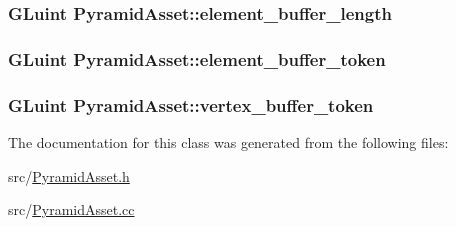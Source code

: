 \subsubsection[{element\+\_\+buffer\+\_\+length}]{\setlength{\rightskip}{0pt plus 5cm}G\+Luint Pyramid\+Asset\+::element\+\_\+buffer\+\_\+length\hspace{0.3cm}{\ttfamily [private]}}\label{classPyramidAsset_a5566105859271b493eab3b5f9c02f866}
\hypertarget{classPyramidAsset_a6f7e2f50904d2941e33df8eb7f5f9c2d}{}
\subsubsection[{element\+\_\+buffer\+\_\+token}]{\setlength{\rightskip}{0pt plus 5cm}G\+Luint Pyramid\+Asset\+::element\+\_\+buffer\+\_\+token\hspace{0.3cm}{\ttfamily [private]}}\label{classPyramidAsset_a6f7e2f50904d2941e33df8eb7f5f9c2d}
\hypertarget{classPyramidAsset_a54d9cec42bc77d07a66e6c1cd55049b0}{}
\subsubsection[{vertex\+\_\+buffer\+\_\+token}]{\setlength{\rightskip}{0pt plus 5cm}G\+Luint Pyramid\+Asset\+::vertex\+\_\+buffer\+\_\+token\hspace{0.3cm}{\ttfamily [private]}}\label{classPyramidAsset_a54d9cec42bc77d07a66e6c1cd55049b0}


The documentation for this class was generated from the following files\+:\begin{DoxyCompactItemize}
\item 
src/\hyperlink{PyramidAsset_8h}{Pyramid\+Asset.\+h}\item 
src/\hyperlink{PyramidAsset_8cc}{Pyramid\+Asset.\+cc}\end{DoxyCompactItemize}
